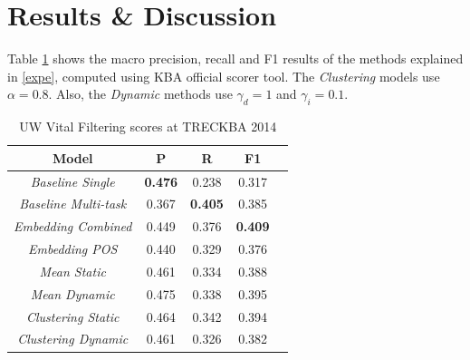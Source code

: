 \documentclass{article}
\begin{document}
\section{Results \& Discussion}

Table \ref{resMacro} shows the macro precision, recall and F1 results of the methods explained in \ref{expe}, computed using KBA official scorer tool. The \textit{Clustering} models use $\alpha=0.8$. Also, the \textit{Dynamic} methods use $\gamma_d=1$ and $\gamma_i=0.1$.


\begin{table}[H]
\center
\begin{tabular}{|c|c|c|c|c|} \hline
\textbf{Model} & \textbf{P} & \textbf{R} & \textbf{F1} \\ \hline\hline
{\textit{Baseline Single}} & \textbf{0.476} & 0.238 & 0.317 \\ \hline
{\textit{Baseline Multi-task}} & 0.367 & \textbf{0.405} & 0.385 \\ \hline
{\textit{Embedding Combined}} & 0.449 & 0.376 & \textbf{0.409} \\ \hline
{\textit{Embedding POS}} & 0.440 & 0.329 & 0.376 \\ \hline
{\textit{Mean Static}} & 0.461 & 0.334 & 0.388 \\ \hline
{\textit{Mean Dynamic}} & 0.475 & 0.338 & 0.395 \\ \hline
{\textit{Clustering Static}} & 0.464 & 0.342 & 0.394 \\ \hline
{\textit{Clustering Dynamic}} & 0.461 & 0.326 & 0.382 \\ \hline
\end{tabular}
\caption{UW Vital Filtering scores at TRECKBA 2014}
\label{resMacro}
\end{table}
\end{document}
